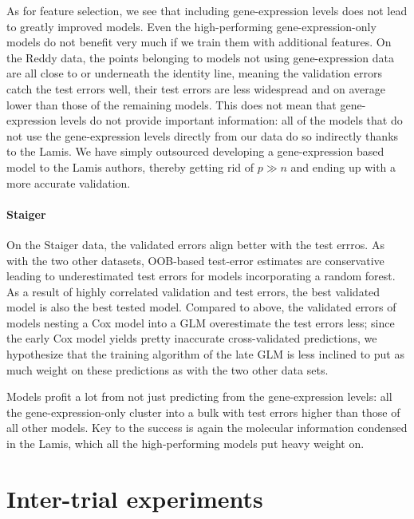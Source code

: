 As for feature selection, we see that including gene-expression levels does not lead to greatly 
improved models. Even the high-performing gene-expression-only models do not benefit very much if 
we train them with additional features. On the Reddy data, the points belonging to models not using 
gene-expression data are all close to or underneath the identity line, meaning the validation errors 
catch the test errors well, their test errors are less widespread and on average lower than those 
of the remaining models. This does not mean that gene-expression levels do not provide important 
information: all of the models that do not use the gene-expression levels directly from our data 
do so indirectly thanks to the Lamis. We have simply outsourced developing a gene-expression based 
model to the Lamis authors, thereby getting rid of $p \gg n$ and ending up with a more accurate 
validation.

\paragraph{Staiger}

On the Staiger data, the validated errors align better with the test errros. As with the two other 
datasets, OOB-based test-error estimates are conservative leading to underestimated test errors 
for models incorporating a random forest. As a result of highly correlated validation and test 
errors, the best validated model is also the best tested model. Compared to above, the validated errors 
of models nesting a Cox model into a GLM overestimate the test errors less; since the early Cox 
model yields pretty inaccurate cross-validated predictions, we hypothesize that the training 
algorithm of the late GLM is less inclined to put as much weight on these predictions as with the 
two other data sets.

Models profit a lot from not just predicting from the gene-expression levels: all the 
gene-expression-only cluster into a bulk with test errors higher than those of all other models. 
Key to the success is again the molecular information condensed in the Lamis, which all the 
high-performing models put heavy weight on.

\section{Inter-trial experiments}

